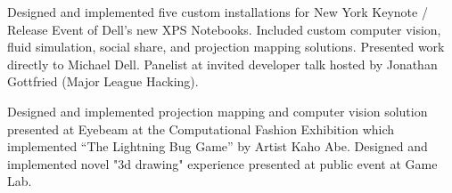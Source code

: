 \documentclass[]{deedy-resume-openfont}
\begin{document}
\begin{minipage}[t]{0.58\textwidth}
\sectionseplg




Designed and implemented five custom installations for New York Keynote / Release Event of Dell’s new XPS Notebooks. Included custom computer vision, fluid simulation, social share, and projection mapping solutions. Presented work directly to Michael Dell. Panelist at invited developer talk hosted by Jonathan Gottfried (Major League Hacking).
\sectionseplg



Designed and implemented projection mapping and computer vision solution presented at Eyebeam at the Computational Fashion Exhibition which implemented “The Lightning Bug Game” by Artist Kaho Abe. Designed and implemented novel "3d drawing" experience presented at public event at  Game Lab. 
\sectionseplg






\end{minipage}
\end{document}
